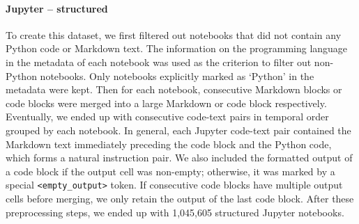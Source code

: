\documentclass[10pt]{article} %
\begin{document}
\paragraph{Jupyter -- structured} To create this dataset, we first filtered out notebooks that did not contain any Python code or Markdown text. The information on the programming language in the metadata of each notebook was used as the criterion to filter out non-Python notebooks. Only notebooks explicitly marked as `Python' in the metadata were kept. Then for each notebook, consecutive Markdown blocks or code blocks were merged into a large Markdown or code block respectively. Eventually, we ended up with consecutive code-text pairs in temporal order grouped by each notebook. In general, each Jupyter code-text pair contained the Markdown text immediately preceding the code block and the Python code, which forms a natural instruction pair. We also included the formatted output of a code block if the output cell was non-empty; otherwise, it was marked by a special \texttt{<empty\_output>} token. If consecutive code blocks have multiple output cells before merging, we only retain the output of the last code block. After these preprocessing steps, we ended up with 1,045,605 structured Jupyter notebooks.
\end{document}
